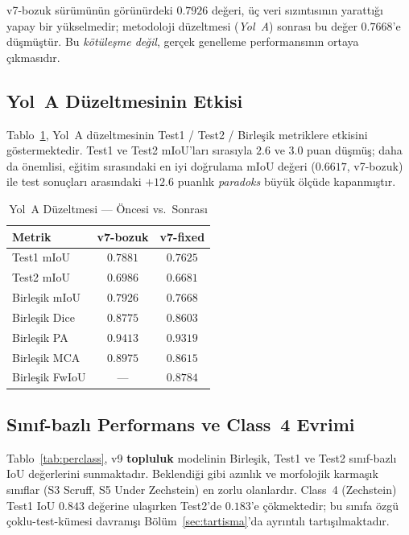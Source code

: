\documentclass[conference,a4paper,10pt]{IEEEtran}
\begin{document}
v7-bozuk sürümünün görünürdeki $0.7926$ değeri, üç veri sızıntısının yarattığı
yapay bir yükselmedir; metodoloji düzeltmesi (\emph{Yol~A}) sonrası bu değer
$0.7668$'e düşmüştür. Bu \emph{kötüleşme değil}, gerçek genelleme performansının
ortaya çıkmasıdır.

\subsection{Yol~A Düzeltmesinin Etkisi}

Tablo~\ref{tab:yola_etki}, Yol~A düzeltmesinin Test1 / Test2 / Birleşik
metriklere etkisini göstermektedir. Test1 ve Test2 mIoU'ları sırasıyla
$2.6$ ve $3.0$ puan düşmüş; daha da önemlisi, eğitim sırasındaki en iyi
doğrulama mIoU değeri ($0.6617$, v7-bozuk) ile test sonuçları arasındaki
$+12.6$ puanlık \emph{paradoks} büyük ölçüde kapanmıştır.

\begin{table}[!t]
\renewcommand{\arraystretch}{1.2}
\caption{Yol~A Düzeltmesi --- Öncesi vs.\ Sonrası}
\label{tab:yola_etki}
\centering
\begin{tabular}{lcc}
\toprule
\textbf{Metrik} & \textbf{v7-bozuk} & \textbf{v7-fixed} \\
\midrule
Test1 mIoU      & $0.7881$ & $0.7625$ \\
Test2 mIoU      & $0.6986$ & $0.6681$ \\
Birleşik mIoU   & $0.7926$ & $0.7668$ \\
Birleşik Dice   & $0.8775$ & $0.8603$ \\
Birleşik PA     & $0.9413$ & $0.9319$ \\
Birleşik MCA    & $0.8975$ & $0.8615$ \\
Birleşik FwIoU  & ---      & $\mathbf{0.8784}$ \\
\bottomrule
\end{tabular}
\end{table}

\subsection{Sınıf-bazlı Performans ve Class~4 Evrimi}

Tablo~\ref{tab:perclass}, v9 \textbf{topluluk} modelinin Birleşik, Test1 ve
Test2 sınıf-bazlı IoU değerlerini sunmaktadır. Beklendiği gibi azınlık ve
morfolojik karmaşık sınıflar (S3 Scruff, S5 Under Zechstein) en zorlu
olanlardır. Class~4 (Zechstein) Test1 IoU $0.843$ değerine ulaşırken
Test2'de $0.183$'e çökmektedir; bu sınıfa özgü çoklu-test-kümesi davranışı
Bölüm~\ref{sec:tartisma}'da ayrıntılı tartışılmaktadır.
\end{document}
